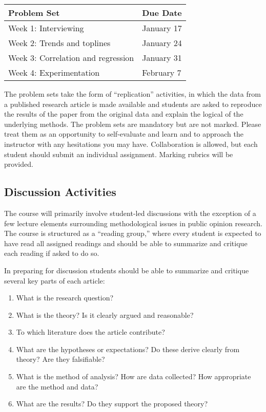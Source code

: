 \documentclass[12pt,a4paper]{article}
\begin{document}
\begin{center}
\begin{tabular}{ll} \hline
\textbf{Problem Set} & \textbf{Due Date} \\ \hline
Week 1: Interviewing & January 17 \\
Week 2: Trends and toplines & January 24 \\
Week 3: Correlation and regression & January 31 \\
Week 4: Experimentation & February 7 \\ \hline
\end{tabular}
\end{center}

The problem sets take the form of ``replication'' activities, in which the data from a published research article is made available and students are asked to reproduce the results of the paper from the original data and explain the logical of the underlying methods. The problem sets are mandatory but are not marked. Please treat them as an opportunity to self-evaluate and learn and to approach the instructor with any hesitations you may have. Collaboration is allowed, but each student should submit an individual assignment. Marking rubrics will be provided.

\subsection{Discussion Activities}

The course will primarily involve student-led discussions with the exception of a few lecture elements surrounding methodological issues in public opinion research. The course is structured as a ``reading group,'' where every student is expected to have read all assigned readings and should be able to summarize and critique each reading if asked to do so.

In preparing for discussion students should be able to summarize and critique several key parts of each article:

\begin{enumerate}
\item What is the research question?
\item What is the theory? Is it clearly argued and reasonable?
\item To which literature does the article contribute?
\item What are the hypotheses or expectations? Do these derive clearly from theory? Are they falsifiable?
\item What is the method of analysis? How are data collected? How appropriate are the method and data?
\item What are the results? Do they support the proposed theory?
\end{enumerate}
\end{document}
